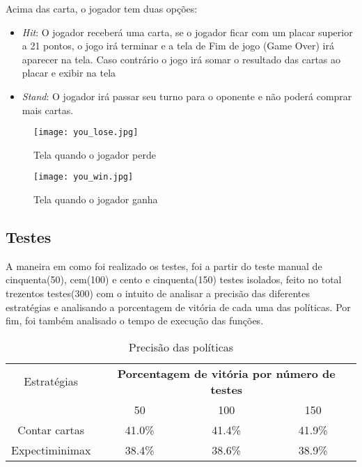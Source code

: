 Acima das carta, o jogador tem duas opções:
\begin{itemize}
    \item \emph{Hit}: O jogador receberá uma carta, se o jogador ficar com um 
    placar superior a 21 pontos, o jogo irá terminar e a tela de Fim de jogo (Game Over)
    irá aparecer na tela. Caso contrário o jogo irá somar o resultado das cartas ao placar 
    e exibir na tela 
    \item \emph{Stand}: O jogador irá passar seu turno para o oponente e não poderá 
    comprar mais cartas.
\end{itemize}

\begin{figure}[ht] 
    \centering
    \texttt{[image: you\_lose.jpg]}
    \caption{Tela quando o jogador perde}
    \label{fig:you_lose}
\end{figure}

\begin{figure}[ht] 
    \centering
    \texttt{[image: you\_win.jpg]}
    \caption{Tela quando o jogador ganha}
    \label{fig:you_win}
\end{figure}

\newpage 

\subsection{Testes}

A maneira em como foi realizado os testes, foi a partir do teste manual 
de cinquenta(50), cem(100) e cento e cinquenta(150) testes isolados, feito no total 
trezentos testes(300) com o intuito de analisar a precisão das diferentes estratégias 
e analisando a porcentagem de vitória de cada uma das políticas. Por fim, foi também 
analisado o tempo de execução das funções.

\begin{table}[htbp]
    \centering
    \caption{Precisão das políticas}
    \begin{tabular}{|c | c | c | c|} 
        \hline
        Estratégias & \multicolumn{3}{|c|}{\textbf{Porcentagem de vitória por número de testes}} \\ 
        \cline{2-4} 
          & 50 & 100 & 150 \\ 
        \hline
        Contar cartas  & 41.0\% & 41.4\% & 41.9\% \\
        \hline
        Expectiminimax & 38.4\% & 38.6\% & 38.9\% \\
        \hline
    \end{tabular}
    \label{tab:precision}
\end{table}

